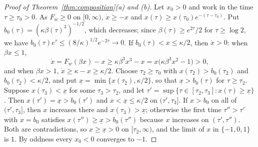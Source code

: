 \documentclass{article} %
\theoremstyle{plain}
\theoremstyle{definition}
\theoremstyle{remark}
\begin{document}
\begin{proof}[Proof of Theorem~\ref{thm:composition}(a) and (b)]
Let $x_0>0$ and work in the time $\tau\ge\tau_0>0$. As $F_w\ge0$ on $[0,\infty)$, $\dot x\ge-x$ and
$x(\tau)\ge x(\tau_0)e^{-(\tau-\tau_0)}$. Put $b_0(\tau)=(\kappa\beta(\tau)^3)^{-1/2}$, which
decreases; since $\beta(\tau)\ge e^{2\tau}/2$ for $\tau\ge\log2$, we have
$b_0(\tau)e^\tau\le(8/\kappa)^{1/2}e^{-2\tau}\to0$. If $b_0(\tau)<x\le\kappa/2$, then
$\dot x>0$: when $\beta x\le1$,
\[
\dot x=F_w(\beta x)-x\ge\kappa\beta^3x^3-x=x\bigl(\kappa\beta^3x^2-1\bigr)>0,
\]
and when $\beta x>1$, $\dot x\ge\kappa-x\ge\kappa/2$. Choose $\tau_2\ge\tau_0$ with
$x(\tau_2)>b_0(\tau_2)$ and $b_0(\tau_2)<\kappa/2$, and put
$\underline x=\min\{x(\tau_2),\kappa/2\}$, so that $\underline x>b_0(\tau)$ for $\tau\ge\tau_2$.
Suppose $x(\tau_3)<\underline x$ for some $\tau_3>\tau_2$, and let
$\tau'=\sup\{\tau\in[\tau_2,\tau_3]:x(\tau)\ge\underline x\}$. Then
$x(\tau')=\underline x>b_0(\tau')$ and $x<\underline x\le\kappa/2$ on $(\tau',\tau_3]$. If
$x>b_0$ on all of $(\tau',\tau_3]$, then $x$ increases there and $x(\tau_3)>\underline x$;
otherwise the first time $\tau''>\tau'$ with $x=b_0$ satisfies
$x(\tau'')\ge\underline x>b_0(\tau'')$ because $x$ increases on $(\tau',\tau'')$. Both are
contradictions, so $x\ge\underline x>0$ on $[\tau_2,\infty)$, and the limit of $x$ in
$\{-1,0,1\}$ is $1$. By oddness every $x_0<0$ converges to $-1$.
\end{proof}
\end{document}
